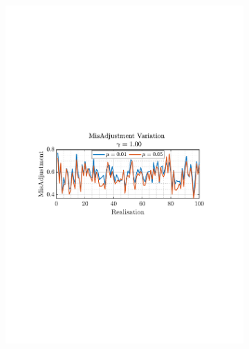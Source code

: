 \documentclass[12pt]{article}
\numberwithin{equation}{section}
\begin{document}
\begin{figure}[H]
				\begin{subfigure}{0.49\textwidth}
					\centering
					\includegraphics[trim={2.2cm 11.2cm 3.00cm  11.2cm}, clip, width=\textwidth]{../MATLAB/figures/q2_1f_fig07.pdf} 
					\captionsetup{justification=centering}
				\end{subfigure}
				\begin{subfigure}{0.49\textwidth}
					\centering

\end{subfigure}
\end{figure}
\end{document}
